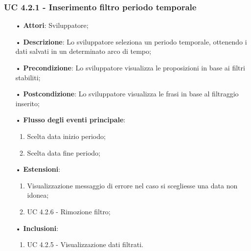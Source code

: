 \subsubsection{UC 4.2.1 - Inserimento filtro periodo temporale}
\begin{itemize}
\item[•]\textbf{Attori}: Sviluppatore;
\item[•]\textbf{Descrizione}: Lo sviluppatore seleziona un periodo temporale, ottenendo i dati salvati in un determinato arco di tempo;
\item[•]\textbf{Precondizione}: Lo sviluppatore visualizza le proposizioni in base ai filtri stabiliti;
\item[•]\textbf{Postcondizione}: Lo sviluppatore visualizza le frasi in base al filtraggio inserito;
\item[•]\textbf{Flusso degli eventi principale}: 
\begin{enumerate}
\item Scelta data inizio periodo;
\item Scelta data fine periodo;
\end{enumerate}
\item[•]\textbf{Estensioni}: 
\begin{enumerate}
	\item Visualizzazione messaggio di errore nel caso si scegliesse una data non idonea;
	\item UC 4.2.6 - Rimozione filtro;
\end{enumerate}
\item[•]\textbf{Inclusioni}:
\begin{enumerate}
\item UC 4.2.5 - Visualizzazione dati filtrati.
\end{enumerate}
\end{itemize}

